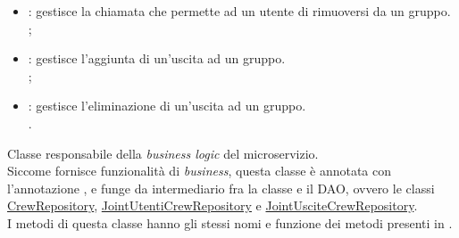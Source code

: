 \begin{itemize}
    \item {}: gestisce la chiamata che permette ad un utente di rimuoversi da un gruppo. \\ ;
    \item {}:  gestisce l'aggiunta di un'uscita ad un gruppo. \\ ;
    \item {}: gestisce l'eliminazione di un'uscita ad un gruppo. \\ .  
\end{itemize}


Classe responsabile della \textit{business logic} del \gls{microservizio}.  \\
Siccome fornisce funzionalità di \textit{business}, questa classe è annotata con l'annotazione , e funge da intermediario fra la classe  e  il \gls{DAO}, ovvero le classi \hyperref[CrewRepository]{CrewRepository}, \hyperref[JointUtentiCrewRepository]{JointUtentiCrewRepository} e \hyperref[JointUsciteCrewRepository]{JointUsciteCrewRepository}. \\
I metodi di questa classe hanno gli stessi nomi e funzione dei metodi presenti in .

